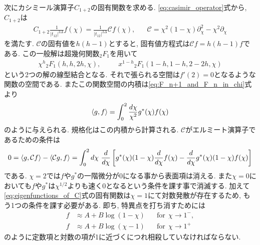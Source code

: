 次にカシミール演算子$C_{1+2}$の固有関数を求める. 
\eqref{eq:casimir_operator}式から, $C_{1+2}$は
\begin{align}
	C_{1+2}\frac{1}{|t_{12}|^{2\Delta}}f(\chi)
	= \frac{1}{|t_{12}|^{2\Delta}}\mathcal{C}f(\chi),\hspace{20pt}
	\mathcal{C} = \chi^2(1 - \chi)\partial_{\chi}^2 - \chi^2\partial_{\chi}
\end{align}
を満たす. 
$\mathcal{C}$の固有値を$h(h-1)$とすると, 固有値方程式は$\mathcal{C}f = h(h-1)f$である. 
この一般解は超幾何関数${}_2F_1$を用いて
\begin{align}
	\chi^h{}_2F_1(h, h, 2h, \chi),\hspace{30pt}
	x^{1-h}{}_2F_1(1-h, 1-h, 2-2h, \chi)
	\label{eq:eigenfunctions_of_C}
\end{align}
という2つの解の線型結合となる. 
それで張られる空間は$f'(2) = 0$となるような関数の空間である. 
またこの関数空間の内積は\eqref{eq:F_n+1_and_F_n_in_chi}式より
\begin{align}
	\langle g, f \rangle = \int_0^2 \frac{d\chi}{\chi^2}g^*(\chi)f(\chi)
	\label{eq:innerproduct}
\end{align}
のように与えられる. 規格化はこの内積から計算される. 
$\mathcal{C}$がエルミート演算子であるための条件は
\begin{align}
	0
	= \langle g, \mathcal{C}f \rangle - \langle \mathcal{C}g, f \rangle
	= \int_0^2 d\chi\ \frac{d}{d\chi}\left[
		g^*(\chi)(1 - \chi)\frac{d}{d\chi}f(\chi)
		- \frac{d}{d\chi}g^*(\chi)(1 - \chi)f(\chi)
	\right]
\end{align}
である. 
$\chi = 2$では$f$や$g^*$の一階微分が0になる事から表面項は消える. 
また$\chi = 0$においても$f$や$g^*$は$\chi^{1/2}$よりも速く0となるという条件を課す事で消滅する. 
加えて\eqref{eq:eigenfunctions_of_C}式の固有関数は$\chi = 1$にて対数発散が存在するため, 
もう1つの条件を課す必要がある. 
即ち, 特異点を打ち消すためには
\begin{align}
	f &\approx A + B\log(1 - \chi)\hspace{20pt}\mathrm{for\ \ }\chi \to 1^-,\nonumber\\
	f &\approx A + B\log(\chi - 1)\hspace{20pt}\mathrm{for\ \ }\chi \to 1^+\nonumber
\end{align}
のように定数項と対数の項が1に近づくにつれ相殺していなければならない. 

